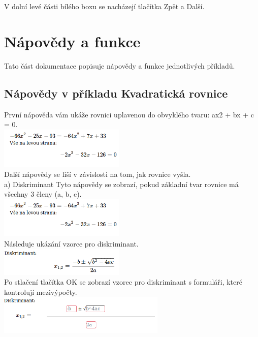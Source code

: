 \documentclass[
]{article}
\begin{document}
V dolní levé části bílého boxu se nacházejí tlačítka Zpět a Další.

\section{Nápovědy a funkce}

Tato část dokumentace popisuje nápovědy a funkce jednotlivých příkladů.

\subsection{Nápovědy v příkladu Kvadratická rovnice}

První nápověda vám ukáže rovnici uplavenou do obvyklého tvaru: ax2 + bx
+ c = 0.\\
\includegraphics[width=6cm]{../../doc-images/zakladnitvar.png}\\
Další nápovědy se
liší v závislosti na tom, jak rovnice vyšla.\\
a) Diskriminant Tyto
nápovědy se zobrazí, pokud základní tvar rovnice má všechny 3 členy (a,
b, c).\\
\includegraphics[width=6cm]{../../doc-images/zakladnitvar.png}\\
Následuje ukázání
vzorce pro diskriminant.\\
\includegraphics[width=6cm]{../../doc-images/diskriminant1.png}\\
Po stlačení tlačítka OK se zobrazí vzorec pro diskriminant s formuláři,
které kontrolují mezivýpočty.\\
\includegraphics[width=8cm]{../../doc-images/diskriminant2.png}\\
\end{document}
